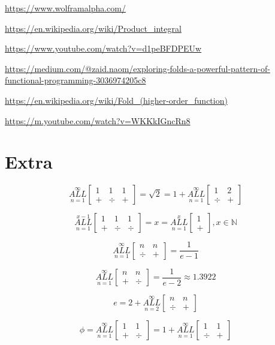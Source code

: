 \documentclass{article}
\begin{document}
\url{https://www.wolframalpha.com/}

\url{https://en.wikipedia.org/wiki/Product_integral}

\url{https://www.youtube.com/watch?v=d1peBFDPEUw}

\url{https://medium.com/@zaid.naom/exploring-folds-a-powerful-pattern-of-functional-programming-3036974205c8}

\url{https://en.wikipedia.org/wiki/Fold_(higher-order_function)}

\url{https://m.youtube.com/watch?v=WKKkIGncRn8}

\section{Extra}

$$\underset{n=1}{\overset{\infty}{ALL}} \begin{bmatrix}
1 & 1 & 1 \\
+&\div&+
\end{bmatrix} = \sqrt{2} = 1+\underset{n=1}{\overset{\infty}{ALL}} \begin{bmatrix}
1 & 2 \\
\div & +
\end{bmatrix}$$

$$\underset{n=1}{\overset{x-1}{ALL}} \begin{bmatrix}
1 & 1 & 1 \\
+&\div&\div
\end{bmatrix}=x=\underset{n=1}{\overset{x}{ALL}} \begin{bmatrix}
1 \\
+
\end{bmatrix}, x\in \mathbb{N}$$

$$\underset{n=1}{\overset{\infty}{ALL}} \begin{bmatrix}
n & n \\
\div & +
\end{bmatrix}=\frac{1}{e-1}$$

$$\underset{n=1}{\overset{\infty}{ALL}} \begin{bmatrix}
n & n \\
+ & \div
\end{bmatrix} = \frac{1}{e-2} \approx 1.3922$$

$$e=2+\underset{n=2}{\overset{\infty}{ALL}} \begin{bmatrix}
n & n \\
\div & +
\end{bmatrix}$$

$$\phi=\underset{n=1}{\overset{\infty}{ALL}} \begin{bmatrix}
1 & 1 \\
+ & \div
\end{bmatrix}=1+\underset{n=1}{\overset{\infty}{ALL}} \begin{bmatrix}
1 & 1 \\
\div & +
\end{bmatrix}$$
\end{document}

